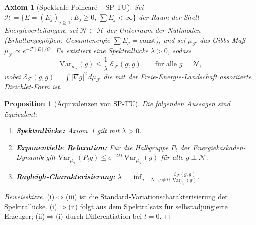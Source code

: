 \documentclass[12pt,a4paper]{article}
\theoremstyle{breakdef}
\theoremstyle{breakplain}
\newtheorem{proposition}[definition]{Proposition}
\newtheorem{axiom}[definition]{Axiom}
\theoremstyle{breakdef}
\begin{document}
\begin{axiom}[Spektrale Poincaré -- SP-TU]\label{ax:sp-tu}
Sei $\mathcal{H} = \{E = (E_j)_{j \geq 1} : E_j \geq 0,\, \sum E_j < \infty\}$ der Raum der Shell-Energieverteilungen, sei $\mathcal{N} \subset \mathcal{H}$ der Unterraum der Nullmoden (Erhaltungsgrößen: Gesamtenergie $\sum E_j = \mathrm{const}$), und sei $\mu_{\mathcal{F}}$ das Gibbs-Maß $\mu_{\mathcal{F}} \propto e^{-\mathcal{F}[E]/\Theta}$. Es existiert eine Spektrallücke $\lambda > 0$, sodass
\begin{equation}\label{eq:sp-tu}
  \mathrm{Var}_{\mu_{\mathcal{F}}}(g) \leq \frac{1}{\lambda}\, \mathcal{E}_{\mathcal{F}}(g, g) \qquad \text{für alle } g \perp \mathcal{N},
\end{equation}
wobei $\mathcal{E}_{\mathcal{F}}(g,g) = \int |\nabla g|^2\, d\mu_{\mathcal{F}}$ die mit der Freie-Energie-Landschaft assoziierte Dirichlet-Form ist.
\end{axiom}

\begin{proposition}[Äquivalenzen von SP-TU]\label{prop:sp-equivalences}
Die folgenden Aussagen sind äquivalent:
\begin{enumerate}
\item[(i)] \textbf{Spektrallücke:} Axiom~\ref{ax:sp-tu} gilt mit $\lambda > 0$.
\item[(ii)] \textbf{Exponentielle Relaxation:} Für die Halbgruppe $P_t$ der Energiekaskaden-Dynamik gilt
  $\mathrm{Var}_{\mu_{\mathcal{F}}}(P_t g) \leq e^{-2\lambda t}\, \mathrm{Var}_{\mu_{\mathcal{F}}}(g)$ für alle $g \perp \mathcal{N}$.
\item[(iii)] \textbf{Rayleigh-Charakterisierung:}
  $\lambda = \inf_{g \perp \mathcal{N},\, g \neq 0} \frac{\mathcal{E}_{\mathcal{F}}(g,g)}{\mathrm{Var}_{\mu_{\mathcal{F}}}(g)}$.
\end{enumerate}
\end{proposition}

\begin{proof}[Beweisskizze]
(i)$\Leftrightarrow$(iii) ist die Standard-Variationscharakterisierung der Spektrallücke. (i)$\Rightarrow$(ii) folgt aus dem Spektralsatz für selbstadjungierte Erzeuger; (ii)$\Rightarrow$(i) durch Differentiation bei $t=0$.
\end{proof}
\end{document}
